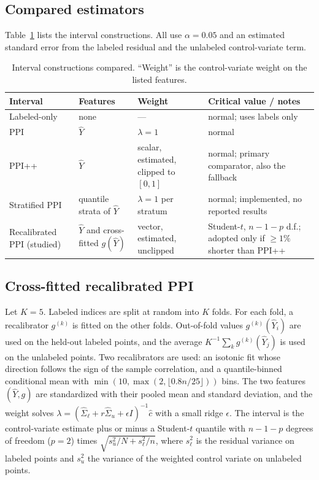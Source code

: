 \documentclass{article}
\newcommand{\Yhat}{\hat Y}
\begin{document}
\subsection{Compared estimators}
Table~\ref{tab:estimators} lists the interval constructions. All use $\alpha=0.05$ and an estimated standard error from the labeled residual and the unlabeled control-variate term.

\begin{table}[t]
\centering
\caption{Interval constructions compared. ``Weight'' is the control-variate weight on the listed features.}
\label{tab:estimators}
\small
\begin{tabular}{p{2.6cm}p{2.9cm}p{3.1cm}p{3.6cm}}
\toprule
Interval & Features & Weight & Critical value / notes \\
\midrule
Labeled-only & none & --- & normal; uses labels only \\
PPI & $\Yhat$ & $\lambda{=}1$ & normal \\
PPI++ & $\Yhat$ & scalar, estimated, clipped to $[0,1]$ & normal; primary comparator, also the fallback \\
Stratified PPI & quantile strata of $\Yhat$ & $\lambda{=}1$ per stratum & normal; implemented, no reported results \\
Recalibrated PPI (studied) & $\Yhat$ and cross-fitted $g(\Yhat)$ & vector, estimated, unclipped & Student-$t$, $n{-}1{-}p$ d.f.; adopted only if $\ge1\%$ shorter than PPI++ \\
\bottomrule
\end{tabular}
\end{table}

\subsection{Cross-fitted recalibrated PPI}
Let $K=5$. Labeled indices are split at random into $K$ folds. For each fold, a recalibrator $g^{(k)}$ is fitted on the other folds. Out-of-fold values $g^{(k)}(\Yhat_i)$ are used on the held-out labeled points, and the average $K^{-1}\sum_k g^{(k)}(\Yhat_j)$ is used on the unlabeled points. Two recalibrators are used: an isotonic fit whose direction follows the sign of the sample correlation, and a quantile-binned conditional mean with $\min(10,\max(2,\lfloor 0.8n/25\rfloor))$ bins. The two features $(\Yhat,g)$ are standardized with their pooled mean and standard deviation, and the weight solves $\lambda=(\hat\Sigma_\ell+r\hat\Sigma_u+\epsilon I)^{-1}\hat c$ with a small ridge $\epsilon$. The interval is the control-variate estimate plus or minus a Student-$t$ quantile with $n-1-p$ degrees of freedom ($p=2$) times $\sqrt{s_u^2/N+s_\ell^2/n}$, where $s_\ell^2$ is the residual variance on labeled points and $s_u^2$ the variance of the weighted control variate on unlabeled points.
\end{document}
